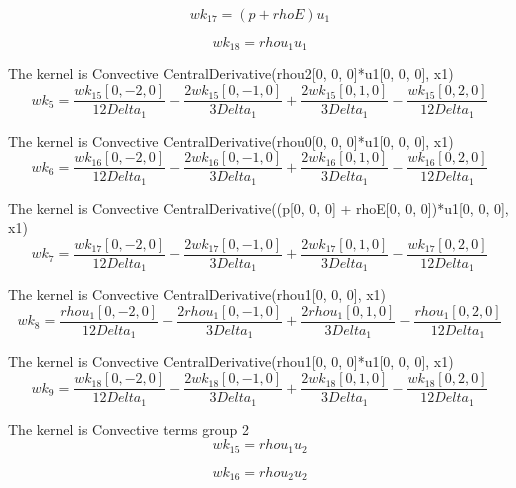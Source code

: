 \documentclass{article}
\begin{document}
\begin{dmath}{wk_{17}} = \left({p} + {rhoE}\right) {u_{1}}\end{dmath}

\begin{dmath}{wk_{18}} = {rhou_{1}} {u_{1}}\end{dmath}

The kernel is Convective CentralDerivative(rhou2[0, 0, 0]*u1[0, 0, 0], x1) \begin{dmath}{wk_{5}} = \frac{{wk_{15}}[{0,-2,0}]}{12 Delta_1} - 
\frac{2 {wk_{15}}[{0,-1,0}]}{3 Delta_1} + \frac{2 
{wk_{15}}[{0,1,0}]}{3 Delta_1} - \frac{{wk_{15}}[{0,2,0}]}{12 
Delta_1}\end{dmath}

The kernel is Convective CentralDerivative(rhou0[0, 0, 0]*u1[0, 0, 0], x1) \begin{dmath}{wk_{6}} = \frac{{wk_{16}}[{0,-2,0}]}{12 Delta_1} - 
\frac{2 {wk_{16}}[{0,-1,0}]}{3 Delta_1} + \frac{2 
{wk_{16}}[{0,1,0}]}{3 Delta_1} - \frac{{wk_{16}}[{0,2,0}]}{12 
Delta_1}\end{dmath}

The kernel is Convective CentralDerivative((p[0, 0, 0] + rhoE[0, 0, 0])*u1[0, 0, 0], x1) \begin{dmath}{wk_{7}} = \frac{{wk_{17}}[{0,-2,0}]}{12 Delta_1} - 
\frac{2 {wk_{17}}[{0,-1,0}]}{3 Delta_1} + \frac{2 
{wk_{17}}[{0,1,0}]}{3 Delta_1} - \frac{{wk_{17}}[{0,2,0}]}{12 
Delta_1}\end{dmath}

The kernel is Convective CentralDerivative(rhou1[0, 0, 0], x1) \begin{dmath}{wk_{8}} = \frac{{rhou_{1}}[{0,-2,0}]}{12 Delta_1} - 
\frac{2 {rhou_{1}}[{0,-1,0}]}{3 Delta_1} + \frac{2 
{rhou_{1}}[{0,1,0}]}{3 Delta_1} - \frac{{rhou_{1}}[{0,2,0}]}{12 
Delta_1}\end{dmath}

The kernel is Convective CentralDerivative(rhou1[0, 0, 0]*u1[0, 0, 0], x1) \begin{dmath}{wk_{9}} = \frac{{wk_{18}}[{0,-2,0}]}{12 Delta_1} - 
\frac{2 {wk_{18}}[{0,-1,0}]}{3 Delta_1} + \frac{2 
{wk_{18}}[{0,1,0}]}{3 Delta_1} - \frac{{wk_{18}}[{0,2,0}]}{12 
Delta_1}\end{dmath}

The kernel is Convective terms group 2\begin{dmath}{wk_{15}} = {rhou_{1}} {u_{2}}\end{dmath}

\begin{dmath}{wk_{16}} = {rhou_{2}} {u_{2}}\end{dmath}
\end{document}
